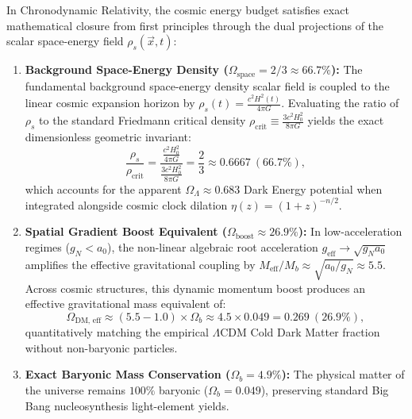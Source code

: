 \documentclass[aps,prd,reprint,superscriptaddress,nofootinbib,floatfix,amsmath,amssymb]{revtex4-2}
\begin{document}
In Chronodynamic Relativity, the cosmic energy budget satisfies exact mathematical closure from first principles through the dual projections of the scalar space-energy field $\rho_s(\vec{x}, t)$:
\begin{enumerate}
    \item \textbf{Background Space-Energy Density ($\Omega_{\text{space}} = 2/3 \approx 66.7\%$):} The fundamental background space-energy density scalar field is coupled to the linear cosmic expansion horizon by $\rho_s(t) = \frac{c^2 H^2(t)}{4\pi G}$. Evaluating the ratio of $\rho_s$ to the standard Friedmann critical density $\rho_{\text{crit}} \equiv \frac{3 c^2 H_0^2}{8\pi G}$ yields the exact dimensionless geometric invariant:
    \begin{equation}
    \frac{\rho_s}{\rho_{\text{crit}}} = \frac{\frac{c^2 H_0^2}{4\pi G}}{\frac{3 c^2 H_0^2}{8\pi G}} = \frac{2}{3} \approx 0.6667\ (66.7\%),
    \label{eq:rho_s_ratio}
    \end{equation}
    which accounts for the apparent $\Omega_\Lambda \approx 0.683$ Dark Energy potential when integrated alongside cosmic clock dilation $\eta(z) = (1+z)^{-n/2}$.
    
    \item \textbf{Spatial Gradient Boost Equivalent ($\Omega_{\text{boost}} \approx 26.9\%$):} In low-acceleration regimes ($g_N < a_0$), the non-linear algebraic root acceleration $g_{\text{eff}} \to \sqrt{g_N a_0}$ amplifies the effective gravitational coupling by $M_{\text{eff}} / M_b \approx \sqrt{a_0 / g_N} \approx 5.5$. Across cosmic structures, this dynamic momentum boost produces an effective gravitational mass equivalent of:
    \begin{equation}
    \Omega_{\text{DM, eff}} \approx (5.5 - 1.0) \times \Omega_b \approx 4.5 \times 0.049 = 0.269\ (26.9\%),
    \label{eq:dm_eff}
    \end{equation}
    quantitatively matching the empirical $\Lambda\text{CDM}$ Cold Dark Matter fraction without non-baryonic particles.
    
    \item \textbf{Exact Baryonic Mass Conservation ($\Omega_b = 4.9\%$):} The physical matter of the universe remains $100\%$ baryonic ($\Omega_b = 0.049$), preserving standard Big Bang nucleosynthesis light-element yields.
\end{enumerate}
\end{document}
